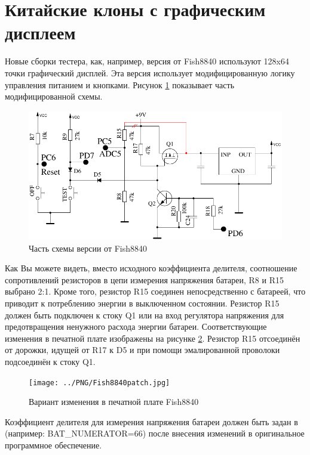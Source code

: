 \section{Китайские клоны с графическим дисплеем}
Новые сборки тестера, как, например, версия от Fish8840 используют 128x64 точки графический дисплей.
Эта версия использует модифицированную логику управления питанием и кнопками. 
Рисунок \ref{fig:Fish8840} показывает часть модифицированной схемы.
\begin{figure}[H]
\centering
\includegraphics[width=.7\textwidth]{../FIG/Fish8840.pdf}
\caption{Часть схемы версии от Fish8840}
\label{fig:Fish8840}
\end{figure}
Как Вы можете видеть, вместо исходного коэффициента делителя, соотношение сопротивлений резисторов в цепи измерения 
напряжения батареи, R8 и R15 выбрано 2:1.
Кроме того, резистор R15 соединен непосредственно с батареей, что приводит к потреблению энергии в выключенном состоянии. 
Резистор R15 должен быть подключен к стоку Q1 или на вход регулятора напряжения для предотвращения ненужного 
расхода энергии батареи.
Соответствующие изменения в печатной плате изображены на рисунке \ref{fig:Fish8840patch}.
Резистор R15 отсоединён от дорожки, идущей от R17 к D5 и при помощи эмалированной проволоки подсоединён к стоку Q1.
\begin{figure}[H]
\centering
\texttt{[image: ../PNG/Fish8840patch.jpg]}
\caption{Вариант изменения в печатной плате Fish8840}
\label{fig:Fish8840patch}
\end{figure}
Коэффициент делителя для измерения напряжения батареи должен быть задан в  (например: BAT\_NUMERATOR=66) 
после внесения изменений в оригинальное программное обеспечение.


